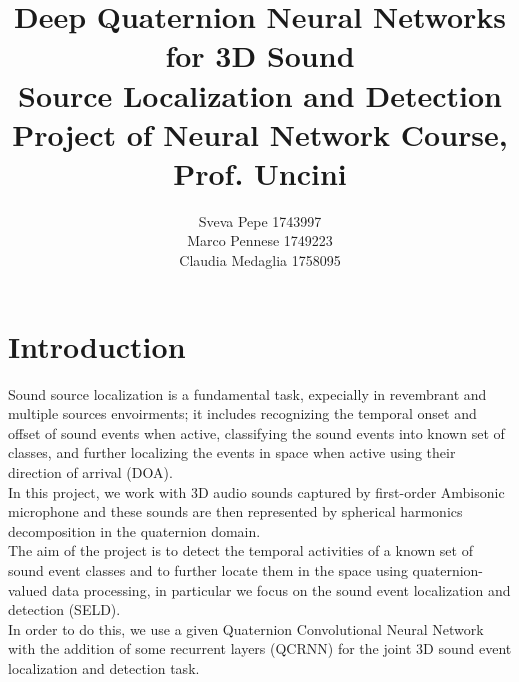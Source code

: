 \documentclass{article}
\title{Deep Quaternion Neural Networks for 3D Sound \\ Source Localization and Detection
\\ \large{\vspace{0.4cm}Project of Neural Network Course, Prof. Uncini}}
\author{Sveva Pepe 1743997 \\  Marco Pennese 1749223 \\  Claudia Medaglia 1758095}
\date{}
\begin{document}
    \maketitle
    \section{Introduction}
    Sound source localization is a fundamental task, expecially in revembrant and multiple sources envoirments; it includes recognizing the temporal onset and offset of sound events when active, classifying the sound events into known set of classes, and further localizing the events in space when active using their direction of arrival (DOA).\\
    In this project, we work with 3D audio sounds captured by first-order Ambisonic microphone and these sounds are then represented 
    by spherical harmonics decomposition in the quaternion domain.
    \\ The aim of the project is to detect the temporal activities of a known set of sound event classes and to further locate them in 
    the space using quaternion-valued data processing, in particular we focus on the sound event localization and detection (SELD). 
    \\ In order to do this, we use a given Quaternion Convolutional Neural Network with the addition of some recurrent layers (QCRNN) 
    for the joint 3D sound event localization and detection task.
\end{document}

